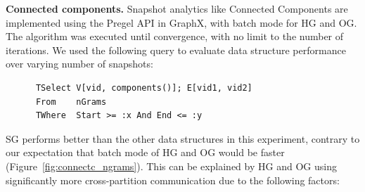 
{\bf Connected components.} Snapshot analytics like Connected
Components are implemented using the Pregel API in GraphX, with batch
mode for HG and OG.  The algorithm was executed until convergence,
with no limit to the number of iterations.  We used the following
query to evaluate data structure performance over varying number of
snapshots:

\begin{small}
\begin{verbatim}
      TSelect V[vid, components()]; E[vid1, vid2]
      From    nGrams
      TWhere  Start >= :x And End <= :y
\end{verbatim}
\end{small}


SG performs better than the other data structures in this experiment,
contrary to our expectation that batch mode of HG and OG would be
faster (Figure~\ref{fig:connectc_ngrams}).  This can be explained by
HG and OG using significantly more cross-partition communication due
to the following factors:

